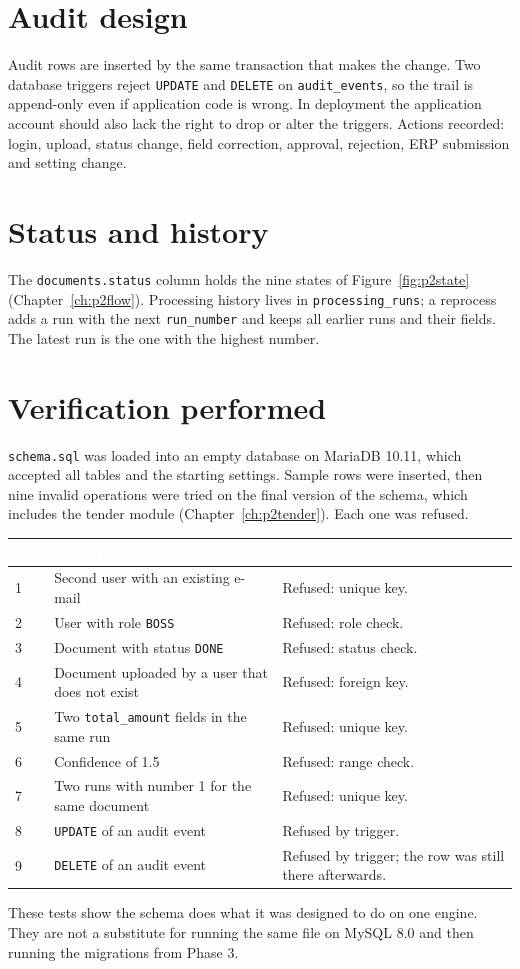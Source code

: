 \documentclass[11pt,a4paper]{report}
\newcommand{\hdr}[1]{\textcolor{white}{\sffamily\bfseries #1}}
\newcommand{\tblstart}{\rowcolors{2}{white}{rowgray}\arrayrulecolor{teal!60}}
\newcommand{\hdrrow}{\rowcolor{navy}}
\begin{document}
\section{Audit design}
Audit rows are inserted by the same transaction that makes the change. Two database triggers reject \texttt{UPDATE} and \texttt{DELETE} on \texttt{audit\_events}, so the trail is append-only even if application code is wrong. In deployment the application account should also lack the right to drop or alter the triggers. Actions recorded: login, upload, status change, field correction, approval, rejection, ERP submission and setting change.

\section{Status and history}
The \texttt{documents.status} column holds the nine states of Figure~\ref{fig:p2state} (Chapter~\ref{ch:p2flow}). Processing history lives in \texttt{processing\_runs}; a reprocess adds a run with the next \texttt{run\_number} and keeps all earlier runs and their fields. The latest run is the one with the highest number.

\section{Verification performed}\label{sec:p2dbtests}
\texttt{schema.sql} was loaded into an empty database on MariaDB 10.11, which accepted all \nTables{} tables and the starting settings. Sample rows were inserted, then nine invalid operations were tried on the final version of the schema, which includes the tender module (Chapter~\ref{ch:p2tender}). Each one was refused.
{\tblstart\small
\begin{longtable}{L{0.8cm}L{7.0cm}L{6.0cm}}
\hdrrow \hdr{No.} & \hdr{Invalid operation tried} & \hdr{Result}\\  & Second user with an existing e-mail & Refused: unique key.\\
2 & User with role \texttt{BOSS} & Refused: role check.\\
3 & Document with status \texttt{DONE} & Refused: status check.\\
4 & Document uploaded by a user that does not exist & Refused: foreign key.\\
5 & Two \texttt{total\_amount} fields in the same run & Refused: unique key.\\
6 & Confidence of 1.5 & Refused: range check.\\
7 & Two runs with number 1 for the same document & Refused: unique key.\\
8 & \texttt{UPDATE} of an audit event & Refused by trigger.\\
9 & \texttt{DELETE} of an audit event & Refused by trigger; the row was still there afterwards.\\
\hline
\end{longtable}}
These tests show the schema does what it was designed to do on one engine. They are not a substitute for running the same file on MySQL 8.0 and then running the migrations from Phase 3.
\end{document}
